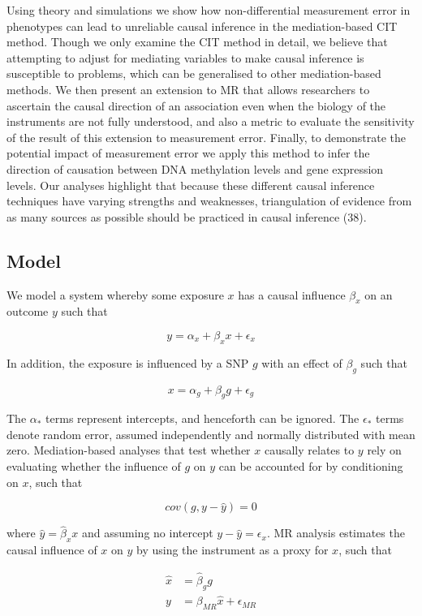 \documentclass[]{article}
\begin{document}
Using theory and simulations we show how non-differential measurement
error in phenotypes can lead to unreliable causal inference in the
mediation-based CIT method. Though we only examine the CIT method in
detail, we believe that attempting to adjust for mediating variables to
make causal inference is susceptible to problems, which can be
generalised to other mediation-based methods. We then present an
extension to MR that allows researchers to ascertain the causal
direction of an association even when the biology of the instruments are
not fully understood, and also a metric to evaluate the sensitivity of
the result of this extension to measurement error. Finally, to
demonstrate the potential impact of measurement error we apply this
method to infer the direction of causation between DNA methylation
levels and gene expression levels. Our analyses highlight that because
these different causal inference techniques have varying strengths and
weaknesses, triangulation of evidence from as many sources as possible
should be practiced in causal inference (38).

\subsection{Model}\label{model}

We model a system whereby some exposure \(x\) has a causal influence
\(\beta_x\) on an outcome \(y\) such that

\[
y = \alpha_x + \beta_x x + \epsilon_x
\]

In addition, the exposure is influenced by a SNP \(g\) with an effect of
\(\beta_g\) such that

\[
x = \alpha_g + \beta_g g + \epsilon_g
\]

The \(\alpha_*\) terms represent intercepts, and henceforth can be
ignored. The \(\epsilon_*\) terms denote random error, assumed
independently and normally distributed with mean zero. Mediation-based
analyses that test whether \(x\) causally relates to \(y\) rely on
evaluating whether the influence of \(g\) on \(y\) can be accounted for
by conditioning on \(x\), such that

\[
cov(g, y - \hat{y}) = 0
\]

where \(\hat{y} = \hat{\beta}_x x\) and assuming no intercept
\(y - \hat{y} = \epsilon_x\). MR analysis estimates the causal influence
of \(x\) on \(y\) by using the instrument as a proxy for \(x\), such
that

\[
\begin{aligned}
\hat{x} & = \hat{\beta}_g g \\
y       & = \beta_{MR}\hat{x} + \epsilon_{MR}
\end{aligned}
\]
\end{document}
